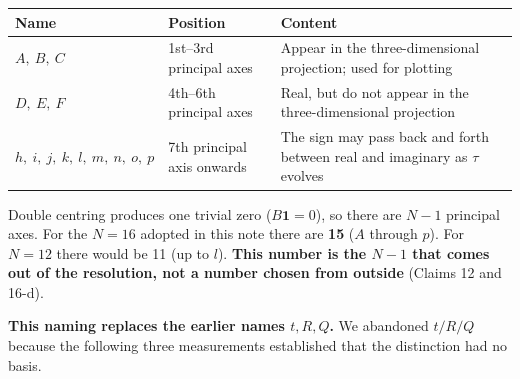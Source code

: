 \documentclass[
  10pt,
]{article}
\newcounter{none} %
\begin{document}
{\def\LTcaptype{none} %
\begin{longtable}[]{@{}
  >{\raggedright\arraybackslash}p{}
  >{\raggedright\arraybackslash}p{}
  >{\raggedright\arraybackslash}p{}@{}}
\toprule\noalign{}
\begin{minipage}[b]{\linewidth}\raggedright
Name
\end{minipage} & \begin{minipage}[b]{\linewidth}\raggedright
Position
\end{minipage} & \begin{minipage}[b]{\linewidth}\raggedright
Content
\end{minipage} \\
\midrule\noalign{}
\endhead
\bottomrule\noalign{}
\endlastfoot
\(A,\ B,\ C\) & 1st--3rd principal axes & Appear in the
three-dimensional projection; used for plotting \\
\(D,\ E,\ F\) & 4th--6th principal axes & Real, but do not appear in the
three-dimensional projection \\
\(h,\ i,\ j,\ k,\ l,\ m,\ n,\ o,\ p\) & 7th principal axis onwards & The
sign may pass back and forth between real and imaginary as \(\tau\)
evolves \\
\end{longtable}
}

Double centring produces one trivial zero (\(B\mathbf{1} = 0\)), so
there are \(N-1\) principal axes. For the \(N = 16\) adopted in this
note there are \textbf{15} (\(A\) through \(p\)). For \(N=12\) there
would be 11 (up to \(l\)). \textbf{This number is the \(N-1\) that comes
out of the resolution, not a number chosen from outside} (Claims 12 and
16-d).

\textbf{This naming replaces the earlier names \(t, R, Q\).} We
abandoned \(t/R/Q\) because the following three measurements established
that the distinction had no basis.
\end{document}
